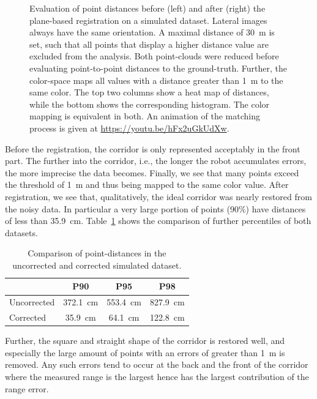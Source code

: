 \begin{figure}
\begin{minipage}[c]{0.495\textwidth}
  	\end{minipage} 	
 	\caption{Evaluation of point distances before (left) and after (right) the plane-based registration on a simulated dataset. Lateral images always have the same orientation. A maximal distance of \SI{30}{m} is set, such that all points that display a higher distance value are excluded from the analysis. Both point-clouds were reduced before evaluating point-to-point distances to the ground-truth. Further, the color-space maps all values with a distance greater than \SI{1}{m} to the same color. The top two columns show a heat map of distances, while the bottom shows the corresponding histogram. The color mapping is equivalent in both. An animation of the matching process is given at \url{https://youtu.be/hFx2uGkUdXw}.} 
 	\label{fig:simulatedEvaluation}
\end{figure} 

Before the registration, the corridor is only represented acceptably in the front part. 
The further into the corridor, i.e., the longer the robot accumulates errors, the more imprecise the data becomes. 
Finally, we see that many points exceed the threshold of \SI{1}{\meter} and thus being mapped to the same color value.
After registration, we see that, qualitatively, the ideal corridor was nearly restored from the noisy data. 
In particular a very large portion of points (90\%) have distances of less than \SI{35.9}{\centi\meter}.
Table~\ref{tab:percentiles} shows the comparison of further percentiles of both datasets. 

\begin{table}
	\centering
	\begin{tabular}{@{}lccc@{}}\hline
		& P90 & P95 & P98 \\ \hline\hline
		Uncorrected & \SI{372.1}{\centi\meter} &  \SI{553.4}{\centi\meter} &  \SI{827.9}{\centi\meter} \\%
		Corrected & \SI{35.9}{\centi\meter} &  \SI{64.1}{\centi\meter} &  \SI{122.8}{\centi\meter} \\\hline%
	\end{tabular}
	\caption{Comparison of point-distances in the uncorrected and corrected simulated dataset.}
	\label{tab:percentiles}
\end{table}

Further, the square and straight shape of the corridor is restored well, and especially the large amount of points with an errors of greater than \SI{1}{m} is removed. 
Any such errors tend to occur at the back and the front of the corridor where the measured range is the largest hence has the largest contribution of the range error. 

